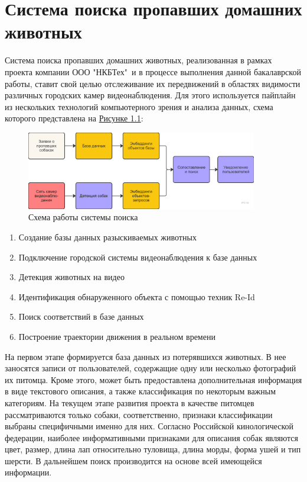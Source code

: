 \chapter{Система поиска пропавших домашних животных}
\label{ch:petsearch}

Система поиска пропавших домашних животных, реализованная в рамках проекта компании ООО "НКБТех"\ и в процессе выполнения данной бакалаврской работы, ставит свой целью отслеживание их передвижений в областях видимости различных городских камер видеонаблюдения. Для этого используется пайплайн из нескольких технологий компьютерного зрения и анализа данных, схема которого представлена на \hyperref[fig:petsearch_scheme]{Рисунке \ref*{fig:petsearch_scheme}}:

\begin{figure}[ht]
	\centering
	\includegraphics[width=0.9\textwidth]{images/petsearch/scheme.png}
	\caption{Схема работы системы поиска}
	\label{fig:petsearch_scheme}
\end{figure}

\begin{enumerate}
    \item Создание базы данных разыскиваемых животных

    \item Подключение городской системы видеонаблюдения к базе данных

    \item Детекция животных на видео

    \item Идентификация обнаруженного объекта с помощью техник Re-Id

    \item Поиск соответствий в базе данных

    \item Построение траектории движения в реальном времени

\end{enumerate}

На первом этапе формируется база данных из потерявшихся животных. В нее заносятся записи от пользователей, содержащие одну или несколько фотографий их питомца. Кроме этого, может быть предоставлена дополнительная информация в виде текстового описания, а также классификация по некоторым важным категориям. На текущем этапе развития проекта в качестве питомцев рассматриваются только собаки, соответственно, признаки классификации выбраны специфичными именно для них. Согласно Российской кинологической федерации, наиболее информативными признаками для описания собак являются цвет, размер, длина лап относительно туловища, длина морды, форма ушей и тип шерсти. В дальнейшем поиск производится на основе всей имеющейся информации.

